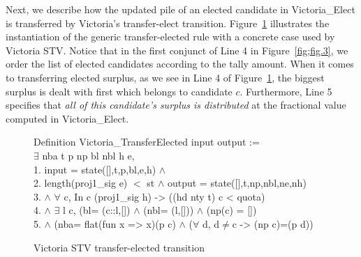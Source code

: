\documentclass{llncs}
\begin{document}
Next, we describe how the updated pile of an elected candidate in {\selectfont Victoria\_Elect} is transferred by Victoria's transfer-elect transition.       
Figure~\ref{fig;fig.4} illustrates the instantiation of the generic
transfer-elected rule with a concrete case used by Victoria STV.
Notice that in the first conjunct of Line 4 in
Figure~\ref{fig;fig.3}, we order the list of elected candidates
according to the tally amount. When it comes to transferring elected
surplus, as we see in Line 4 of Figure~\ref{fig;fig.4}, the biggest
surplus is dealt with first which belongs to candidate $c$.
Furthermore, Line 5 specifies that  \emph{all of this candidate's
surplus is distributed} at the fractional value computed in
{\selectfont Victoria\_Elect}.
\begin{scriptsize}
\begin{figure}[t]
{\selectfont
 Definition Victoria\_TransferElected \textsf{input} \textsf{output} :=\\ $\exists$ nba t p np bl nbl h e, \\
     1. \textsf{input} = \textsf{state}([],t,p,bl,e,h) $\wedge$\\
     2. \textsf{length}(proj1\_sig e) $<$ st $\wedge$
     \textsf{output} = \textsf{state}([],t,np,nbl,ne,nh)\\
     3. $\wedge$ $\forall$ c, In c (proj1\_sig h) -> ((\textsf{hd} nty t) c < quota)\\
 4. $\wedge$ $\exists$ l c, (bl= (c::l,[]) $\wedge$ (nbl= (l,[])) $\wedge$ (np(c) = []) \\
 5. $\wedge$ (nba= \textsf{flat}(fun x => x)(p c) $\wedge$ ($\forall$ d, d$\neq$c -> (np c)=(p d))\\  
}
\caption{Victoria STV transfer-elected transition}
\label{fig;fig.4}
\end{figure}
\end{scriptsize}
\end{document}
